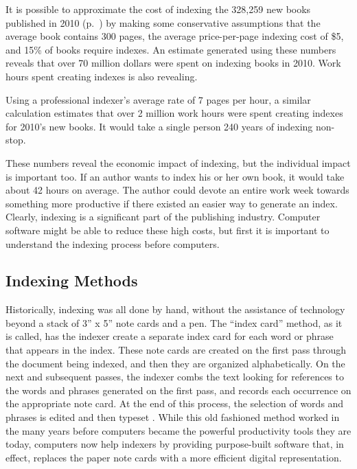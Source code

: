 It is possible to approximate the cost of indexing the 328,259 new books published in 2010 (p.~\pageref{fig:new-books}) by making some conservative assumptions that the average book contains 300 pages, the average price-per-page indexing cost of \$5, and 15\% of books require indexes.
An estimate generated using these numbers reveals that over 70 million dollars were spent on indexing books in 2010. Work hours spent creating indexes is also revealing.

Using a professional indexer's average rate of 7 pages per hour, a similar calculation estimates that over 2 million work hours were spent creating indexes for 2010's new books. It would take a single person 240 years of indexing non-stop.

These numbers reveal the economic impact of indexing, but the individual impact is important too.
If an author wants to index his or her own book, it would take about 42 hours on average. The author could devote an entire work week towards something more productive if there existed an easier way to generate an index.
Clearly, indexing is a significant part of the publishing industry.
Computer software might be able to reduce these high costs, but first it is important to understand the indexing process before computers.

\subsection{Indexing Methods}

Historically, indexing was all done by hand, without the assistance of technology beyond a stack of 3'' x 5'' note cards and a pen.
The ``index card'' method, as it is called, has the indexer create a separate index card for each word or phrase that appears in the index.
These note cards are created on the first pass through the document being indexed, and then they are organized alphabetically.
On the next and subsequent passes, the indexer combs the text looking for references to the words and phrases generated on the first pass, and records each occurrence on the appropriate note card.
At the end of this process, the selection of words and phrases is edited and then typeset \cite{mulvany}.
While this old fashioned method worked in the many years before computers became the powerful productivity tools they are today, computers now help indexers by providing purpose-built software that, in effect, replaces the paper note cards with a more efficient digital representation.

